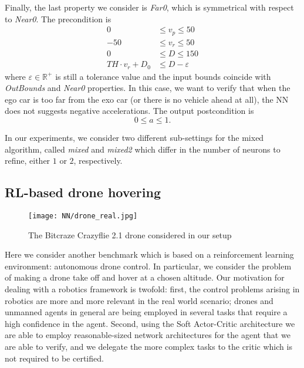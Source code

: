 Finally, the last property we consider is \textit{Far0}, which is
symmetrical with respect to \textit{Near0}. The precondition is
%
\begin{equation}
	\begin{aligned}
		0 & \leq v_p \leq 50 \\
		-50 & \leq v_r \leq 50 \\
		0 & \leq D \leq 150\\
		TH \cdot v_r + D_0 & \leq D - \varepsilon
	\end{aligned}
	\label{eq:far0-in}
\end{equation}
%
where $\varepsilon \in {\mathbb{R}^+}$ is still a tolerance value and the
input bounds coincide with \textit{OutBounds} and \textit{Near0}
properties. In this case, we want to verify that when the ego car
is too far from the exo car (or there is no vehicle ahead at all), the
NN does not suggests negative accelerations. The output postcondition is
%
\begin{equation}
	0 \leq a \leq 1.
	\label{eq:far0-out}
\end{equation}

In our experiments, we consider two different sub-settings for the mixed
algorithm, called \textit{mixed} and \textit{mixed2} which differ in the
number of neurons to refine, either $1$ or $2$, respectively.

\subsection{RL-based drone hovering}

\begin{figure}[t]
	\caption{\label{fig:drone}The Bitcraze Crazyflie 2.1 drone
		considered in our setup}
	\centering
	\texttt{[image: NN/drone\_real.jpg]}
\end{figure}
%
Here we consider another benchmark which is based on a reinforcement learning
environment: autonomous drone control. In particular, we consider the 
problem of making a drone take off and hover at a chosen altitude. Our motivation 
for dealing with a robotics framework is twofold: first, the control problems
arising in robotics are more and more relevant in the real world scenario; drones
and unmanned agents in general are being employed in several tasks that require
a high confidence in the agent. Second, using the Soft Actor-Critic architecture 
we are able to employ reasonable-sized network architectures for the agent that 
we are able to verify, and we delegate the more complex tasks to the critic which 
is not required to be certified.

